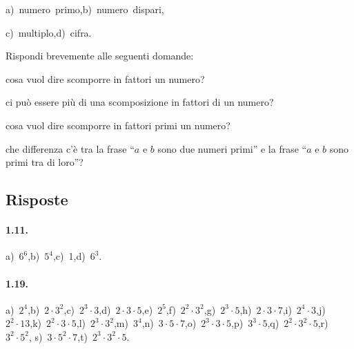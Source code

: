 \begin{multicols}{2}
\begin{esercizio}
a)~numero~primo,\quad b)~numero~dispari,

c)~multiplo,\quad d)~cifra.
\end{esercizio}

\begin{esercizio}
Rispondi brevemente alle seguenti domande:
 \begin{enumeratea}
 \item cosa vuol dire scomporre in fattori un numero?
 \item ci può essere più di una scomposizione in fattori di un numero?
 \item cosa vuol dire scomporre in fattori primi un numero?
 \item che differenza c'è tra la frase ``$a$ e $b$ sono due numeri primi'' e la frase ``$a$ e $b$ sono primi tra di loro''?
 \end{enumeratea}
\end{esercizio}
\end{multicols}

\subsection{Risposte}

\paragraph{1.11.}
a)~$6^6$,\quad b)~$5^4$,\quad c)~1,\quad d)~$6^3$.

\paragraph{1.19.}
a)~$2^4$,\quad b)~$ 2\cdot 3^2 $,\quad c)~$ 2^3 \cdot 3 $,\quad d)~$ 2\cdot 3\cdot 5 $,\quad e)~$ 2^5 $,\quad f)~$ 2^2 \cdot 3^2 $,\quad g)~$ 2^3 \cdot 5 $,\quad h)~$ 2\cdot 3\cdot 7 $,\quad i)~$ 2^4 \cdot 3 $,\quad j)~$ 2^2 \cdot 13 $,\quad k)~$ 2^2 \cdot 3 \cdot5 $,\quad l)~$ 2^3 \cdot 3^2 $,\quad m)~$ 3^4 $,\quad n)~$ 3\cdot 5\cdot 7 $,\quad o)~$ 2^3 \cdot 3\cdot 5 $,\quad p)~$ 3^3 \cdot 5 $,\quad q)~$ 2^2 \cdot 3^2 \cdot 5 $,\quad r)~$ 3^2 \cdot 5^2 $, s)~$3\cdot5^2\cdot7$,\quad t)~$ 2^3 \cdot 3^2 \cdot5$.

